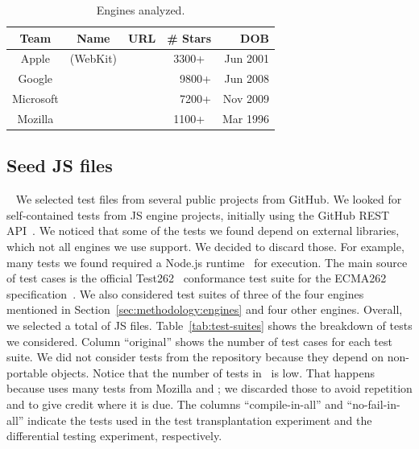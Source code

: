 \documentclass[10pt,conference,anonymous]{IEEEtran}
\begin{document}

\begin{table}[t]
  \centering
  \caption{\label{tab:engines}Engines analyzed.}
  \begin{tabular}{cccrr}
    \toprule
    Team & Name & URL & \# Stars  & DOB \\
    \midrule
    Apple & \jsc{} (WebKit) & \cite{jsc2018repo} &
    \multicolumn{1}{c}{3300+} & Jun 2001\\
    Google & \veight{} & \cite{v82018repo} & 9800+ & Jun 2008\\
    Microsoft & \chakra{} & \cite{chakra2018repo} & 7200+ & Nov 2009\\
    Mozilla & \smonkey{} & \cite{spidermonkey2018repo} &
    \multicolumn{1}{c}{1100+} & Mar 1996\\
   \bottomrule     
  \end{tabular}
\end{table}

\subsection{Seed JS files\label{sec:seeds}}~
We selected test files from several public projects from GitHub. We
looked for self-contained tests from JS engine projects, initially
using the GitHub REST API~\cite{github-rest-api}. We noticed that some
of the tests we found depend on external libraries, which not all
engines we use support. We decided to discard those. For example, many
tests we found required a Node.js runtime~\cite{node} for
execution. The main source of test cases is the official
Test262~\cite{tc39-github} conformance test suite for the ECMA262
specification~\cite{ecmas262-spec}. We also considered test suites of
three of the four engines mentioned in
Section~\ref{sec:methodology:engines} and four other engines. Overall,
we selected a total of \totfiles{} JS
files. Table~\ref{tab:test-suites} shows the breakdown of tests we
considered. Column ``original'' shows the number of test cases for
each test suite. We did not consider tests from the \chakra{}
repository because they depend on non-portable objects. Notice that
the number of tests in \veight\ is low. That happens because \veight{}
uses many tests from Mozilla and \jsc{}; we discarded those to avoid
repetition and to give credit where it is due. The columns
``compile-in-all'' and ``no-fail-in-all'' indicate the tests used in
the test transplantation experiment and the differential testing
experiment, respectively.
\end{document}
